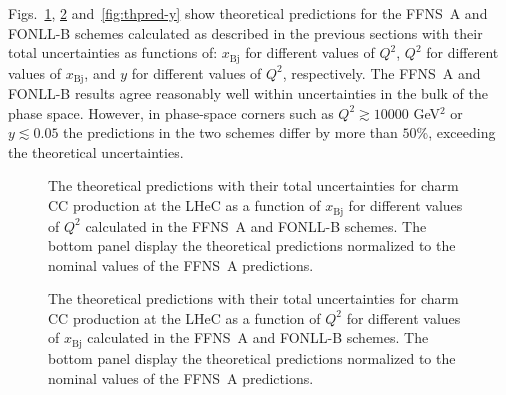 \documentclass[pdftex,twocolumn,epjc3]{svjour3}          %
\newcommand{\xbj}{\ensuremath{x_{\text{Bj}}}\xspace}
\newcommand{\fonll} {{FONLL-B}\xspace}
\newcommand{\ffns} {{FFNS~A}\xspace}
\begin{document}
Figs.~\ref{fig:thpred-x}, \ref{fig:thpred-q2} and~\ref{fig:thpred-y}
show theoretical predictions for the \ffns and \fonll schemes 
calculated as described in the previous sections 
with their total uncertainties as functions of: \xbj for different values
of $Q^2$, $Q^2$ for different values of \xbj, and $y$ for different
values of $Q^2$, respectively.
%
The \ffns and \fonll results agree reasonably well within
uncertainties in the bulk of the phase space. However, in phase-space
corners such as $Q^2 \gtrsim 10000$ GeV$^2$ or $y \lesssim 0.05$ the
predictions in the two schemes differ by more than $50\%$, exceeding
the theoretical uncertainties.

\begin{figure}
    \centering
    \caption{The theoretical predictions with their total
      uncertainties for charm CC production at the LHeC as a function
      of \xbj for different values of $Q^2$ calculated in the \ffns
      and \fonll schemes. The bottom panel display the theoretical
      predictions normalized to the nominal values of the \ffns
      predictions.}
    \label{fig:thpred-x}
\end{figure}

\begin{figure}
    \centering
    \caption{The theoretical predictions with their total
      uncertainties for charm CC production at the LHeC as a function
      of $Q^2$ for different values of \xbj calculated in the \ffns
      and \fonll schemes. The bottom panel display the theoretical
      predictions normalized to the nominal values of the \ffns
      predictions.}
    \label{fig:thpred-q2}
\end{figure}
\end{document}
